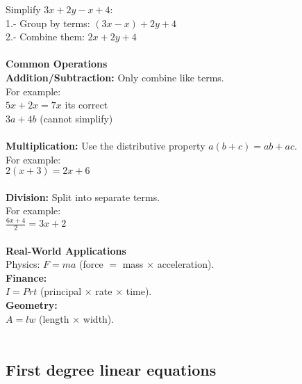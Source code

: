 \documentclass{article} %
\begin{document}
Simplify $3x+2y-x+4$:\\
1.- Group by terms: $(3x-x)+2y+4$\\
2.- Combine them: $2x+2y+4$\\
\\
\textbf{Common Operations}\\
\textbf{Addition/Subtraction:} Only combine like terms.\\
For example:\\
$5x + 2x = 7x$ its correct\\
$3a + 4b$ (cannot simplify)\\
\\
\textbf{Multiplication:} Use the distributive property $a(b+c) = ab + ac$.\\
For example:\\
$2(x + 3) = 2x + 6$\\
\\
\textbf{Division:} Split into separate terms.\\
For example:\\
$\frac{6x + 4}{2} = 3x + 2$\\
\\
\textbf{Real-World Applications}\\

Physics: $F = ma$ (force $=$ mass $\times$ acceleration).\\

\textbf{Finance:}\\
$I = Prt$ (principal $\times$ rate $\times$ time).\\

\textbf{Geometry:}\\
$A = lw$ (length $\times$ width).\\
\\
\subsection{First degree linear equations}
\end{document}
